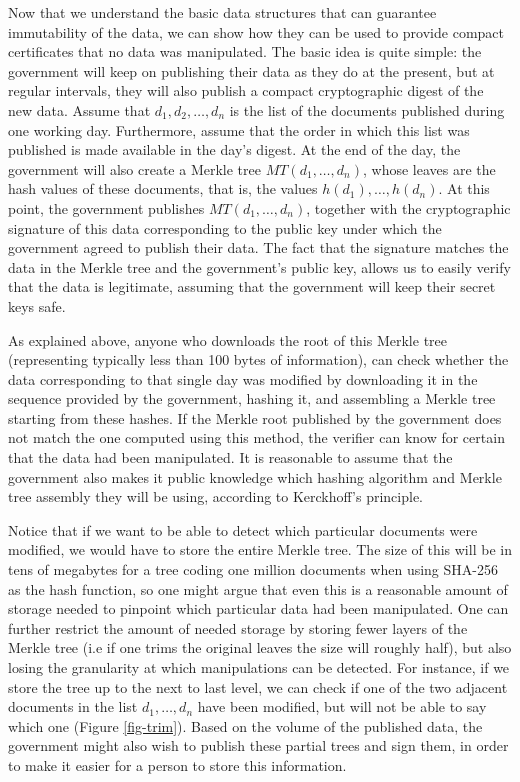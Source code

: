 \medskip
{} Now that we understand the basic data structures that can guarantee immutability of the data, we can show how they can be used to provide compact certificates that no data was manipulated. The basic idea is quite simple: the government will keep on publishing their data as they do at the present, but at regular intervals, they will also publish a compact cryptographic digest of the new data. Assume that $d_1,d_2,\ldots ,d_n$ is the list of the documents published during one working day. Furthermore, assume that the order in which this list was published is made available in the day's digest. At the end of the day, the government will also create a Merkle tree $MT(d_1,\ldots ,d_n)$, whose leaves are the hash values of these documents, that is, the values $h(d_1),\ldots ,h(d_n)$. At this point, the government publishes $MT(d_1,\ldots ,d_n)$, together with the cryptographic signature of this data corresponding to the public key under which the government agreed to publish their data. The fact that the signature matches the data in the Merkle tree and the government's public key, allows us to easily verify that the data is legitimate, assuming that the government will keep their secret keys safe.

As explained above, anyone who downloads the root of this Merkle tree (representing typically less than 100 bytes of information), can check whether the data corresponding to that single day was modified by downloading it in the sequence provided by the government, hashing it, and assembling a Merkle tree starting from these hashes. If the Merkle root published by the government does not match the one computed using this method, the verifier can know for certain that the data had been manipulated. It is reasonable to assume that the government also makes it public knowledge which hashing algorithm and Merkle tree assembly they will be using, according to Kerckhoff's principle.

Notice that if we want to be able to detect which particular documents were modified, we would have to store the entire Merkle tree. The size of this will be in tens of megabytes for a tree coding one million documents when using SHA-256 as the hash function, so one might argue that even this is a reasonable amount of storage needed to pinpoint which particular data had been manipulated. One can further restrict the amount of needed storage by storing fewer layers of the Merkle tree (i.e if one trims the original leaves the size will roughly half), but also losing the granularity at which manipulations can be detected. For instance, if we store the tree up to the next to last level, we can check if one of the two adjacent documents in the list $d_1,\ldots ,d_n$ have been modified, but will not be able to say which one (Figure \ref{fig-trim}). Based on the volume of the published data, the government might also wish to publish these partial trees and sign them, in order to make it easier for a person to store this information.

